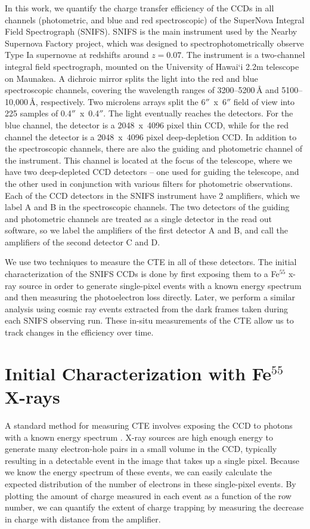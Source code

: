 In this work, we quantify the charge transfer efficiency of the CCDs in all channels (photometric, and blue and red spectroscopic) of the SuperNova Integral Field Spectrograph (SNIFS). SNIFS is the main instrument used by the Nearby Supernova Factory \citep[SNfactory, ]{aldering_overview_2002} project, which was designed to spectrophotometrically observe Type Ia supernovae at redshifts around $z=0.07$. The instrument is a two-channel integral field spectrograph, mounted on the University of Hawai`i 2.2m telescope on Maunakea. A dichroic mirror splits the light into the red and blue spectroscopic channels, covering the wavelength ranges of 3200–5200\,\AA{} and 5100–10,000\,\AA, respectively. Two microlens arrays split the 6$''$~x~6$''$ field of view into 225 samples of 0.4$''$~x~0.4$''$. The light eventually reaches the detectors. For the blue channel, the detector is a 2048~x~4096 pixel thin CCD, while for the red channel the detector is a 2048~x~4096 pixel deep-depletion CCD. In addition to the spectroscopic channels, there are also the guiding and photometric channel of the instrument. This channel is located at the focus of the telescope, where we have two deep-depleted CCD detectors -- one used for guiding the telescope, and the other used in conjunction with various filters for photometric observations. Each of the CCD detectors in the SNIFS instrument have 2 amplifiers, which we label A and B in the spectroscopic channels. The two detectors of the guiding and photometric channels are treated as a single detector in the read out software, so we label the amplifiers of the first detector A and B, and call the amplifiers of the second detector C and D. 

We use two techniques to measure the CTE in all of these detectors. The initial characterization of the SNIFS CCDs is done by first exposing them to a Fe$^{55}$ x-ray source in order to generate single-pixel events with a known energy spectrum and then measuring the photoelectron loss directly. Later, we perform a similar analysis using cosmic ray events extracted from the dark frames taken during each SNIFS observing run. These in-situ measurements of the CTE allow us to track changes in the efficiency over time.

\section{Initial Characterization with \texorpdfstring{Fe$^{55}$}{Fe-55} X-rays}
A standard method for measuring CTE involves exposing the CCD to photons with a known energy spectrum \citep{janesick_scientific_2001}. X-ray sources are high enough energy to generate many electron-hole pairs in a small volume in the CCD, typically resulting in a detectable event in the image that takes up a single pixel. Because we know the energy spectrum of these events, we can easily calculate the expected distribution of the number of electrons in these single-pixel events. By plotting the amount of charge measured in each event as a function of the row number, we can quantify the extent of charge trapping by measuring the decrease in charge with distance from the amplifier.

